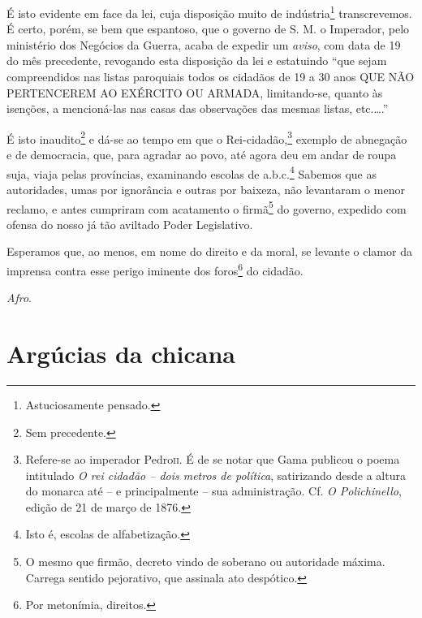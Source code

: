 É isto evidente em face da lei, cuja disposição muito de
indústria\footnote{ Astuciosamente pensado.} transcrevemos. É certo,
porém, se bem que espantoso, que o governo de S. M. o Imperador, pelo
ministério dos Negócios da Guerra, acaba de expedir um \emph{aviso}, com
data de 19 do mês precedente, revogando esta disposição da lei e
estatuindo ``que sejam compreendidos nas listas paroquiais todos os
cidadãos de 19 a 30 anos QUE NÃO PERTENCEREM AO EXÉRCITO OU ARMADA,
limitando-se, quanto às isenções, a mencioná-las nas casas das
observações das mesmas listas, etc.\ldots.''

É isto inaudito\footnote{ Sem precedente.} e dá-se ao tempo em que o
Rei-cidadão,\footnote{ Refere-se ao imperador Pedro\textsc{ii}. É de se notar
  que Gama publicou o poema intitulado \emph{O rei cidadão -- dois
  metros de política}, satirizando desde a altura do monarca até -- e
  principalmente -- sua administração. Cf. \emph{O Polichinello}, edição
  de 21 de março de 1876.} exemplo de abnegação e de democracia, que,
para agradar ao povo, até agora deu em andar de roupa suja, viaja pelas
províncias, examinando escolas de a.b.c.\footnote{ Isto é, escolas de
  alfabetização.} Sabemos que as autoridades, umas por ignorância e
outras por baixeza, não levantaram o menor reclamo, e antes cumpriram
com acatamento o firmã\footnote{ O mesmo que firmão, decreto vindo de
  soberano ou autoridade máxima. Carrega sentido pejorativo, que
  assinala ato despótico.} do governo, expedido com ofensa do nosso já
tão aviltado Poder Legislativo.

Esperamos que, ao menos, em nome do direito e da moral, se levante o
clamor da imprensa contra esse perigo iminente dos foros\footnote{ Por
  metonímia, direitos.} do cidadão.

\emph{Afro}.

\part{Argúcias da chicana}


